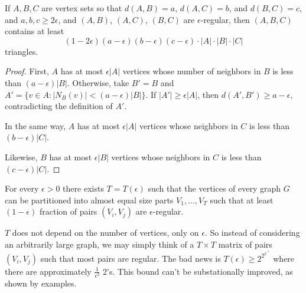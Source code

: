 \begin{lemma} \label{lem:eregular_yields_triangles}
If $A,B,C$ are vertex sets so that $d(A,B) = a$, $d(A,C)=b$, and $d(B,C)=c$, and $a,b,c\geq 2 \epsilon$, and $(A,B)$, $(A,C)$, $(B,C)$ are $\epsilon$-regular, then $(A,B,C)$ contains at least \[
(1-2 \epsilon)(a- \epsilon)(b- \epsilon)(c- \epsilon)\cdot |A|\cdot |B|\cdot|C|
\]
triangles.
\end{lemma}
\begin{proof}	
First, $A$ has at most $\epsilon |A|$ vertices whose number of neighbors in $B$ is less than $(a- \epsilon)|B|$. Otherwise, take $B'=B$ and $A' = \{v\in A: |N_B(v)| < (a - \epsilon)|B|\}$. If $|A'|\geq \epsilon |A|$, then $d(A',B') \geq a - \epsilon$, contradicting the definition of $A'$.

In the same way, $A$ has at most $\epsilon|A|$ vertices whose neighbors in $C$ is less than $(b - \epsilon)|C|$.

Likewise, $B$ has at most $\epsilon |B|$ vertices whose neighbors in $C$ is less than $(c- \epsilon)|C|$.

\end{proof}





\begin{theorem} \label{thm:regularity_lemma}
For every $\epsilon>0$ there exists $T = T(\epsilon)$ such that the vertices of every graph $G$ can be partitioned into almost equal size parts $V_1,\dotsc, V_T$ such that at least $(1-\epsilon)$ fraction of pairs $(V_i,V_j)$ are $\epsilon$-regular.
\end{theorem}

\begin{remark}
$T$ does not depend on the number of vertices, only on $\epsilon$. So instead of considering an arbitrarily large graph, we may simply think of a $T\times T$ matrix of pairs $(V_i,V_j)$ such that most pairs are regular. The bad news is $T(\epsilon)\geq 2^{2^{2^{\iddots^2}}}$ where there are approximately $\frac{1}{\epsilon^2}$ $2$'s. This bound can't be substationally improved, as shown by examples.
\end{remark}

